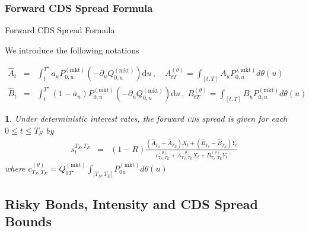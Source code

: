 \documentclass[serif]{beamer}
\newtheorem{proposition}[theorem]{\translate{Proposition}}
\newcommand\Qmkt{Q^{(\mathrm{mkt})}}
\numberwithin{equation}{section}
\newcommand\du{\mathrm{d}u\,}
\begin{document}
\subsubsection{Forward CDS Spread Formula}

\begin{frame}{Forward CDS Spread Formula}


We introduce the following notations

\begin{eqnarray*}
\hat A_t &=& \int_{t}^{T^\star}{a_uP^{\mathrm{(mkt)}}_{0,u}(-\partial_u Q^{\mathrm{(mkt)}}_{0,u})\du}, \quad A^{(\theta)}_{tT} = \int_{[t,T]}{A_uP^{\mathrm{(mkt)}}_{0,u} } d\theta(u)\\
\hat B_t &=& \int_t^{T^\star}{ (1-a_u)P^{\mathrm{(mkt)}}_{0,u}(-\partial_u Q^{\mathrm{(mkt)}}_{0,u})\du},\;
B^{(\theta)}_{tT} = \int_{[t,T]}{B_uP^{\mathrm{(mkt)}}_{0,u} } d\theta(u)
\end{eqnarray*}\pause

\begin{proposition}\emph{ Under deterministic interest rates, the forward \textsc{cds} spread is given  for each $0\leq t\leq T_S$ by
\begin{eqnarray}\label{eq::CDS_Forward}
s_{t}^{T_S,T_E}&=& (1-R)\frac{ (\hat A_{T_S}-\hat A_{T_E})X_t +(\hat B_{T_S}-\hat B_{T_E}) Y_t }{ c^{(\theta)}_{T_S,T_E} + A^{(\theta)}_{T_S,T_E} X_t + B^{(\theta)}_{T_S,T_E}Y_t }
 \end{eqnarray}
where $c^{(\theta)}_{T_S,T_E}=\Qmkt_{0T^\star}\int_{]T_S,T_E]}{P^{(\mathrm{mkt})}_{0u}d\theta(u)}$
}
\end{proposition}

\end{frame}
\subsection{Risky Bonds, Intensity and CDS Spread Bounds}
\end{document}
